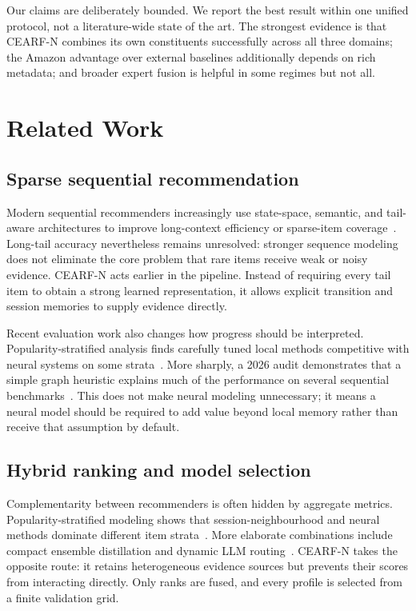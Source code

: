 \documentclass[runningheads]{llncs}
\newcommand{\method}{CEARF-N}
\begin{document}
Our claims are deliberately bounded. We report the best result within one
unified protocol, not a literature-wide state of the art. The strongest
evidence is that \method{} combines its own constituents successfully across
all three domains; the Amazon advantage over external baselines additionally
depends on rich metadata; and broader expert fusion is helpful in some regimes
but not all.

\section{Related Work}
\subsection{Sparse sequential recommendation}
Modern sequential recommenders increasingly use state-space, semantic, and
tail-aware architectures to improve long-context efficiency or sparse-item
coverage~\cite{sigma2025,llm2rec2025,longtail2026}. Long-tail accuracy
nevertheless remains unresolved: stronger sequence modeling does not eliminate
the core problem that rare items receive weak or noisy evidence. \method{}
acts earlier in the pipeline. Instead of requiring every tail item to obtain a
strong learned representation, it allows explicit transition and session
memories to supply evidence directly.

Recent evaluation work also changes how progress should be interpreted.
Popularity-stratified analysis finds carefully tuned local methods competitive
with neural systems on some strata~\cite{popstrat2025}. More sharply, a 2026
audit demonstrates that a simple graph heuristic explains much of the
performance on several sequential benchmarks~\cite{graphshortcut2026}. This
does not make neural modeling unnecessary; it means a neural model should be
required to add value beyond local memory rather than receive that assumption
by default.

\subsection{Hybrid ranking and model selection}
Complementarity between recommenders is often hidden by aggregate metrics.
Popularity-stratified modeling shows that session-neighbourhood and neural
methods dominate different item strata~\cite{popstrat2025}. More elaborate
combinations include compact ensemble distillation and dynamic LLM
routing~\cite{flame2026,dynamicllm2026}. \method{} takes the opposite route:
it retains heterogeneous evidence sources but prevents their scores from
interacting directly. Only ranks are fused, and every profile is selected from
a finite validation grid.
\end{document}
